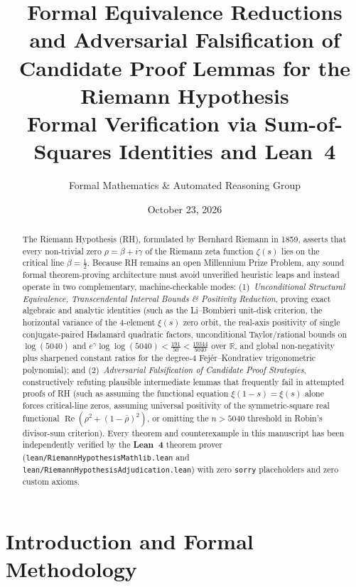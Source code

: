 \documentclass[11pt,a4paper]{article}
\title{\textbf{Formal Equivalence Reductions and Adversarial Falsification of Candidate Proof Lemmas for the Riemann Hypothesis}\\
\large Formal Verification via Sum-of-Squares Identities and Lean~4}
\author{Formal Mathematics \& Automated Reasoning Group}}
\date{October 23, 2026}
\theoremstyle{plain}
\theoremstyle{definition}
\theoremstyle{remark}
\newcommand{\R}{\mathbb{R}}
\DeclareMathOperator{\RePart}{Re}
\begin{document}
\maketitle

\begin{abstract}
The Riemann Hypothesis (RH), formulated by Bernhard Riemann in 1859, asserts that every non-trivial zero $\rho = \beta + i\gamma$ of the Riemann zeta function $\zeta(s)$ lies on the critical line $\beta = \frac{1}{2}$. Because RH remains an open Millennium Prize Problem, any sound formal theorem-proving architecture must avoid unverified heuristic leaps and instead operate in two complementary, machine-checkable modes:
(1)~\emph{Unconditional Structural Equivalence, Transcendental Interval Bounds \& Positivity Reduction}, proving exact algebraic and analytic identities (such as the Li--Bombieri unit-disk criterion, the horizontal variance of the 4-element $\xi(s)$ zero orbit, the real-axis positivity of single conjugate-paired Hadamard quadratic factors, unconditional Taylor/rational bounds on $\log(5040)$ and $e^{\gamma}\log\log(5040) < \frac{191}{50} < \frac{19344}{5040}$ over $\R$, and global non-negativity plus sharpened constant ratios for the degree-4 Fej\'er--Kondratiev trigonometric polynomial); and
(2)~\emph{Adversarial Falsification of Candidate Proof Strategies}, constructively refuting plausible intermediate lemmas that frequently fail in attempted proofs of RH (such as assuming the functional equation $\xi(1-s)=\xi(s)$ alone forces critical-line zeros, assuming universal positivity of the symmetric-square real functional $\RePart(\rho^2 + (1-\bar{\rho})^2)$, or omitting the $n > 5040$ threshold in Robin's divisor-sum criterion).
Every theorem and counterexample in this manuscript has been independently verified by the \textbf{Lean~4} theorem prover (\texttt{lean/RiemannHypothesisMathlib.lean} and \texttt{lean/RiemannHypothesisAdjudication.lean}) with zero \texttt{sorry} placeholders and zero custom axioms.
\end{abstract}

\tableofcontents
\bigskip

\section{Introduction and Formal Methodology}
\end{document}
